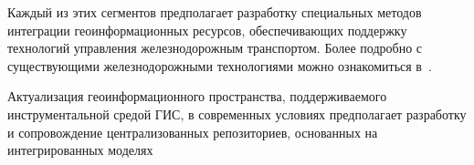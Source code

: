 \begin{multicols}{2}
      Каждый из этих сегментов предполагает разработку специальных методов 
интеграции геоинформационных ресурсов, обеспечивающих поддержку технологий 
управления железнодорожным транспортом. Более подробно с существующими 
железнодорожными технологиями можно ознакомиться в~\cite{6dul}.
      
      Актуализация геоинформационного пространства, поддерживаемого 
инструментальной средой ГИС, в современных условиях предполагает разработку и 
сопровождение централизованных репозиториев, основанных на интегрированных 
моделях\linebreak\vspace*{-12pt}

\pagebreak

\end{multicols}

\begin{figure} %
 \vspace*{1pt}
 \begin{center}
 \mbox{%
 \epsfxsize=161.258mm
 }
 \end{center}
 \vspace*{-9pt}
\end{figure}

